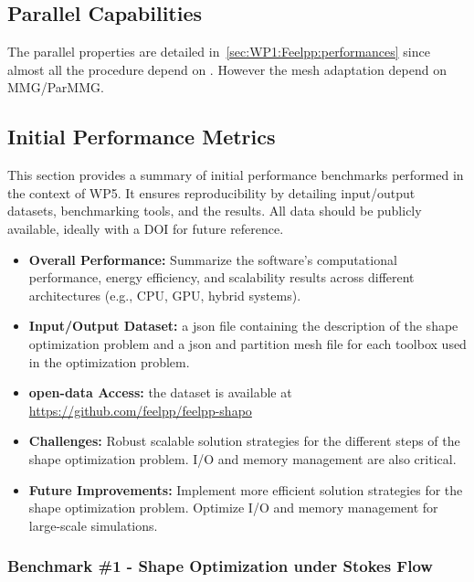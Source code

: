 \subsection{Parallel Capabilities}
\label{sec:WP5:Feelpp:performances}
 
The parallel properties are detailed in~\cref{sec:WP1:Feelpp:performances} since almost all the procedure depend on \Feelpp. 
However the mesh adaptation depend on MMG/ParMMG.

\subsection{Initial Performance Metrics}
\label{sec:WP5:Feelpp:metrics}

This section provides a summary of initial performance benchmarks performed in the context of WP5. It ensures reproducibility by detailing input/output datasets, benchmarking tools, and the results. All data should be publicly available, ideally with a DOI for future reference.

\begin{itemize}
    \item \textbf{Overall Performance:} Summarize the software's computational performance, energy efficiency, and scalability results across different architectures (e.g., CPU, GPU, hybrid systems).
    \item \textbf{Input/Output Dataset:} a json file containing the description of the shape optimization problem and a json and partition mesh file for each toolbox used in the optimization problem.
    \item \textbf{open-data Access:} the dataset is available at \url{https://github.com/feelpp/feelpp-shapo}
    \item \textbf{Challenges:} Robust scalable solution strategies for the different steps of the shape optimization problem. I/O and memory management are also critical.
    \item \textbf{Future Improvements:} Implement more efficient solution strategies for the shape optimization problem. Optimize I/O and memory management for large-scale simulations.
\end{itemize}

\subsubsection{Benchmark \#1 - Shape Optimization under Stokes Flow}

